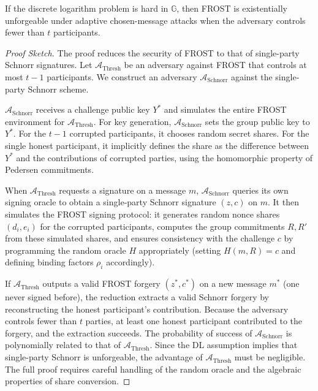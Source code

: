 \begin{theorem}
If the discrete logarithm problem is hard in \(\mathbb{G}\), then FROST is existentially unforgeable under adaptive chosen-message attacks when the adversary controls fewer than \(t\) participants.
\end{theorem}
\begin{proof}[Proof Sketch]
The proof reduces the security of FROST to that of single-party Schnorr signatures. Let \(\mathcal{A}_{\text{Thresh}}\) be an adversary against FROST that controls at most \(t-1\) participants. We construct an adversary \(\mathcal{A}_{\text{Schnorr}}\) against the single-party Schnorr scheme.

\(\mathcal{A}_{\text{Schnorr}}\) receives a challenge public key \(Y^*\) and simulates the entire FROST environment for \(\mathcal{A}_{\text{Thresh}}\). For key generation, \(\mathcal{A}_{\text{Schnorr}}\) sets the group public key to \(Y^*\). For the \(t-1\) corrupted participants, it chooses random secret shares. For the single honest participant, it implicitly defines the share as the difference between \(Y^*\) and the contributions of corrupted parties, using the homomorphic property of Pedersen commitments.

When \(\mathcal{A}_{\text{Thresh}}\) requests a signature on a message \(m\), \(\mathcal{A}_{\text{Schnorr}}\) queries its own signing oracle to obtain a single-party Schnorr signature \((z,c)\) on \(m\). It then simulates the FROST signing protocol: it generates random nonce shares \((d_i,e_i)\) for the corrupted participants, computes the group commitments \(R,R'\) from these simulated shares, and ensures consistency with the challenge \(c\) by programming the random oracle \(H\) appropriately (setting \(H(m,R)=c\) and defining binding factors \(\rho_i\) accordingly).

If \(\mathcal{A}_{\text{Thresh}}\) outputs a valid FROST forgery \((z^*,c^*)\) on a new message \(m^*\) (one never signed before), the reduction extracts a valid Schnorr forgery by reconstructing the honest participant's contribution. Because the adversary controls fewer than \(t\) parties, at least one honest participant contributed to the forgery, and the extraction succeeds. The probability of success of \(\mathcal{A}_{\text{Schnorr}}\) is polynomially related to that of \(\mathcal{A}_{\text{Thresh}}\). Since the DL assumption implies that single-party Schnorr is unforgeable, the advantage of \(\mathcal{A}_{\text{Thresh}}\) must be negligible. The full proof requires careful handling of the random oracle and the algebraic properties of share conversion.
\end{proof}

